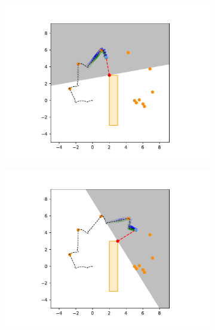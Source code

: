 \begin{figure}[H]
\begin{subfigure}{0.20\textwidth}
        \includegraphics[width=\textwidth]{figures/Simulations/sim_rrt/frame_4.pdf}
    \end{subfigure}%
    \hfill
    \begin{subfigure}{0.20\textwidth}
        \centering
        \includegraphics[width=\textwidth]{figures/Simulations/sim_rrt/frame_6.pdf}
    \end{subfigure}%
    \hfill
    \begin{subfigure}{0.20\textwidth}
        \centering

\end{subfigure}
\end{figure}
